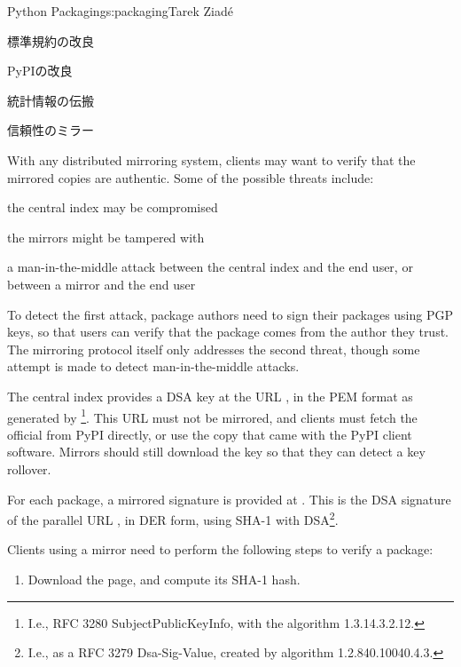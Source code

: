 \begin{aosachapter}{Python Packaging}{s:packaging}{Tarek Ziad\'{e}}
\begin{aosasect1}{標準規約の改良}
\begin{aosasect2}{PyPIの改良}
\begin{aosasect3}{統計情報の伝搬}
\end{aosasect3}

\begin{aosasect3}{信頼性のミラー}

With any distributed mirroring system, clients may want to verify that
the mirrored copies are authentic.  Some of the possible threats
include:

\begin{aosaitemize}

  \item the central index may be compromised

  \item the mirrors might be tampered with

  \item a man-in-the-middle attack between the central index and the end
  user, or between a mirror and the end user

\end{aosaitemize}

\noindent
To detect the first attack, package authors need to sign their
packages using PGP keys, so that users can verify that the package
comes from the author they trust.  The mirroring protocol itself only
addresses the second threat, though some attempt is made to detect
man-in-the-middle attacks.

The central index provides a DSA key at the URL , in
the PEM format as generated by \footnote{I.e.,
RFC 3280 SubjectPublicKeyInfo,
with the algorithm 1.3.14.3.2.12.}. This URL must not be mirrored,
and clients must fetch the official  from PyPI
directly, or use the copy that came with the PyPI client
software. Mirrors should still download the key so that they can
detect a key rollover.

For each package, a mirrored signature is provided at
.  This is the DSA signature of the parallel
URL , in DER form, using SHA-1 with
DSA\footnote{I.e., as a RFC 3279 Dsa-Sig-Value, created by algorithm
  1.2.840.10040.4.3.}.

Clients using a mirror need to perform the following steps to verify a
package:

\begin{enumerate}

  \item Download the  page, and compute its SHA-1 hash.


\end{enumerate}
\end{aosasect3}
\end{aosasect2}
\end{aosasect1}
\end{aosachapter}
